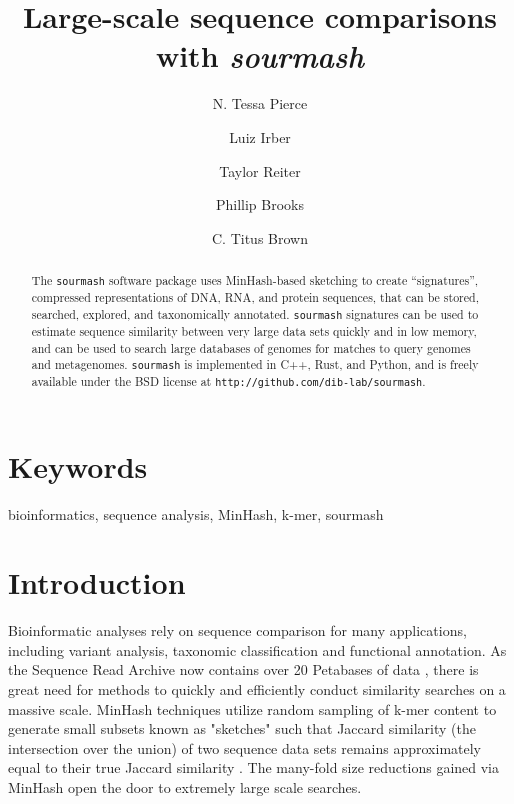 \documentclass[10pt,a4paper,twocolumn]{article}
\begin{document}
\title{Large-scale sequence comparisons with \textit{sourmash}}
\author[1*]{N. Tessa Pierce}
\author[1*]{Luiz Irber}
\author[1,2*]{Taylor Reiter}
\author[1*]{Phillip Brooks}
\author[1**]{C. Titus Brown}

\maketitle
\thispagestyle{fancy}


\begin{abstract}

The \lstinline{sourmash} software package uses MinHash-based sketching to create “signatures”, compressed representations of DNA, RNA, and protein sequences, that can be stored, searched, explored, and taxonomically annotated. \lstinline{sourmash} signatures can be used to estimate sequence similarity between very large data sets quickly and in low memory, and can be used to search large databases of genomes for matches to query genomes and metagenomes. \lstinline{sourmash} is implemented in C++, Rust, and Python, and is freely available under the BSD license at \lstinline{http://github.com/dib-lab/sourmash}.


\end{abstract}

\section*{Keywords}

bioinformatics, sequence analysis, MinHash, k-mer, sourmash

\clearpage

\section*{Introduction}

Bioinformatic analyses rely on sequence comparison for many applications, including variant analysis, taxonomic classification and functional annotation. As the Sequence Read Archive now contains over 20 Petabases of data \cite{ncbi_2018}, there is great need for methods to quickly and efficiently conduct similarity searches on a massive scale. MinHash techniques \cite{broder1997resemblance} utilize random sampling of k-mer content to generate small subsets known as "sketches" such that Jaccard similarity (the intersection over the union) of two sequence data sets remains approximately equal to their true Jaccard similarity \cite{broder1997resemblance, ondov2016mash}. The many-fold size reductions gained via MinHash open the door to extremely large scale searches.
\end{document}
